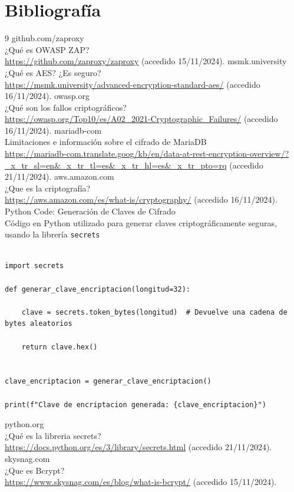 \documentclass[a4paper,12pt]{article}
\newcommand{\code}[1]{\texttt{#1}}  %
\begin{document}
\section{Bibliografía}
\begin{thebibliography}{9}
	 github.com/zaproxy\\ ¿Qué es OWASP ZAP?\\	\url{https://github.com/zaproxy/zaproxy} (accedido 15/11/2024).
	 msmk.university\\ ¿Qué es AES? ¿Es seguro?\\	\url{https://msmk.university/advanced-encryption-standard-aes/} (accedido 16/11/2024).
	 owasp.org\\ ¿Qué son los fallos criptográficos?\\	\url{https://owasp.org/Top10/es/A02_2021-Cryptographic_Failures/} (accedido 16/11/2024).
	 mariadb-com\\ Limitaciones e información sobre el cifrado de MariaDB\\	\url{https://mariadb-com.translate.goog/kb/en/data-at-rest-encryption-overview/?_x_tr_sl=en&_x_tr_tl=es&_x_tr_hl=es&_x_tr_pto=rq} (accedido 21/11/2024).
	 aws.amazon.com\\ ¿Que es la criptografía?\\	\url{https://aws.amazon.com/es/what-is/cryptography/} (accedido 16/11/2024).
	 Python Code: Generación de Claves de Cifrado\\
	Código en Python utilizado para generar claves criptográficamente seguras, usando la librería \code{secrets}
	\begin{lstlisting}
		
import secrets
		
def generar_clave_encriptacion(longitud=32):
		
	clave = secrets.token_bytes(longitud)  # Devuelve una cadena de bytes aleatorios
		
	return clave.hex()
		
		
clave_encriptacion = generar_clave_encriptacion()
			
print(f"Clave de encriptacion generada: {clave_encriptacion}")

	\end{lstlisting}
	 python.org\\ ¿Qué es la libreria secrets?\\ \url{https://docs.python.org/es/3/library/secrets.html} (accedido 21/11/2024).
	 skysnag.com\\ ¿Que es Bcrypt?\\
	\url{https://www.skysnag.com/es/blog/what-is-bcrypt/}  (accedido 15/11/2024).
	

\end{thebibliography}
\end{document}

